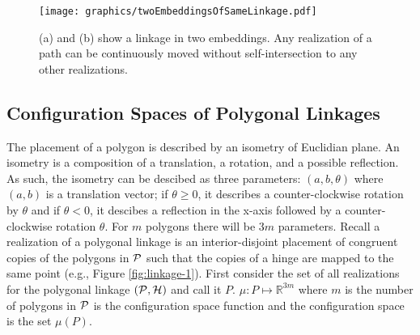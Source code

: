 \documentclass[10pt]{CSUNthesis}
\theoremstyle{plain}%
\theoremstyle{definition}
\theoremstyle{remark}
\newcommand{\HH}{{\cal H}} %
\renewcommand{\PP}{{\cal P}} %
\newcommand{\bbR}{{\mathbb{R}}}
\newcommand{\lr}[1]{\left( #1 \right)}
\begin{document}






\begin{figure}[!htbp]%
\begin{center}
\texttt{[image: graphics/twoEmbeddingsOfSameLinkage.pdf]}
\end{center} 
\caption{(a) and (b) show a linkage in two embeddings.  Any realization of a path can be continuously moved without self-intersection to any other realizations.}
\label{fig:configuration-3}
\end{figure}

\subsection{Configuration Spaces of Polygonal Linkages}
The placement of a polygon is described by an isometry of Euclidian plane.
An isometry is a composition of a translation, a rotation, and a possible reflection.
As such, the isometry can be descibed as three parameters: $\lr{a,b,\theta}$ where $(a,b)$ is a translation vector; if $\theta \geq 0$, it describes a counter-clockwise rotation by $\theta$ and if $\theta < 0$, it descibes a reflection in the x-axis followed by a counter-clockwise rotation $\theta$.
For $m$ polygons there will be $3 m$ parameters.
Recall a realization of a polygonal linkage is an interior-disjoint placement of congruent copies of the polygons in $\PP$ such that the copies of a hinge are mapped to the same point (e.g., Figure \ref{fig:linkage-1}).
First consider the set of all realizations for the polygonal linkage $\left(\PP,\HH\right)$ and call it $P$.  
$\mu:P \mapsto \bbR^{3m}$ where $m$ is the number of polygons in $\PP$ is the configuration space function and the configuration space is the set $\mu(P)$. 
\end{document}
